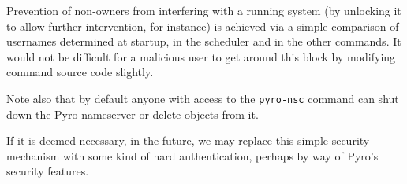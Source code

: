 
Prevention of non-owners from interfering with a running system (by
unlocking it to allow further intervention, for instance) is achieved
via a simple comparison of usernames determined at startup, in the
scheduler and in the other commands. It would not be difficult for a
malicious user to get around this block by modifying command source code
slightly.

Note also that by default anyone with access to the \lstinline=pyro-nsc=
command can shut down the Pyro nameserver or delete objects from it. 

If it is deemed necessary, in the future, we may replace this simple
security mechanism with some kind of hard authentication, perhaps by way
of Pyro's security features.
